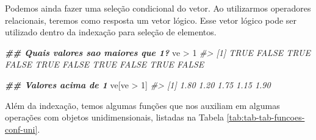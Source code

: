 \documentclass[
]{book}
\newenvironment{Shaded}{\begin{snugshade}}{\end{snugshade}}
\newcommand{\CommentTok}[1]{\textcolor[rgb]{0.37,0.37,0.37}{\textit{#1}}}
\newcommand{\DecValTok}[1]{\textcolor[rgb]{0.06,0.06,0.06}{#1}}
\newcommand{\DocumentationTok}[1]{\textcolor[rgb]{0.37,0.37,0.37}{\textbf{\textit{#1}}}}
\newcommand{\NormalTok}[1]{#1}
\newcommand{\SpecialCharTok}[1]{\textcolor[rgb]{0,0,0}{#1}}
\begin{document}
Podemos ainda fazer uma seleção condicional do vetor. Ao utilizarmos operadores relacionais, teremos como resposta um vetor lógico. Esse vetor lógico pode ser utilizado dentro da indexação para seleção de elementos.

\begin{Shaded}
\begin{Highlighting}[]
\DocumentationTok{\#\# Quais valores sao maiores que 1?}
\NormalTok{ve }\SpecialCharTok{\textgreater{}} \DecValTok{1}
\CommentTok{\#\textgreater{}  [1]  TRUE FALSE  TRUE FALSE  TRUE FALSE  TRUE FALSE  TRUE FALSE}

\DocumentationTok{\#\# Valores acima de 1}
\NormalTok{ve[ve }\SpecialCharTok{\textgreater{}} \DecValTok{1}\NormalTok{]}
\CommentTok{\#\textgreater{} [1] 1.80 1.20 1.75 1.15 1.90}
\end{Highlighting}
\end{Shaded}

Além da indexação, temos algumas funções que nos auxiliam em algumas operações com objetos unidimensionais, listadas na Tabela \ref{tab:tab-tab-funcoes-conf-uni}.
\end{document}
